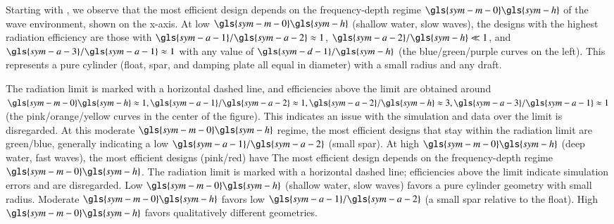 \ifdefined\DISSERTATION
    Starting with , we observe that the most efficient design depends on the frequency-depth regime $\gls{sym-m-0}\gls{sym-h}$ of the wave environment, shown on the x-axis.
    At low $\gls{sym-m-0}\gls{sym-h}$ (shallow water, slow waves), the designs with the highest radiation efficiency are those with $\gls{sym-a-1}/\gls{sym-a-2} \approx 1$, $\gls{sym-a-2}/\gls{sym-h} \ll 1$, and $\gls{sym-a-3}/\gls{sym-a-1}\approx 1$ with any value of $\gls{sym-d-1}/\gls{sym-h}$ (the blue/green/purple curves on the left).
    This represents a pure cylinder (float, spar, and damping plate all equal in diameter) with a small radius and any draft.
    
    The radiation limit is marked with a horizontal dashed line, and efficiencies above the limit are obtained around $\gls{sym-m-0}\gls{sym-h}\approx 1, \gls{sym-a-1}/\gls{sym-a-2}\approx 1, \gls{sym-a-2}/\gls{sym-h}\approx 3, \gls{sym-a-3}/\gls{sym-a-1}\approx 1$ (the pink/orange/yellow curves in the center of the figure).
    This indicates an issue with the simulation and data over the limit is disregarded.
    At this moderate $\gls{sym-m-0}\gls{sym-h}$ regime, the most efficient designs that stay within the radiation limit are green/blue, generally indicating a low $\gls{sym-a-1}/\gls{sym-a-2}$ (small spar).
    At high $\gls{sym-m-0}\gls{sym-h}$ (deep water, fast waves), the most efficient designs (pink/red) have
\else
    The most efficient design depends on the frequency-depth regime $\gls{sym-m-0}\gls{sym-h}$.
    The radiation limit is marked with a horizontal dashed line; efficiencies above the limit indicate simulation errors and are disregarded.
    Low $\gls{sym-m-0}\gls{sym-h}$ (shallow water, slow waves) favors a pure cylinder geometry with small radius.
    Moderate $\gls{sym-m-0}\gls{sym-h}$ favors low $\gls{sym-a-1}/\gls{sym-a-2}$ (a small spar relative to the float).
    High $\gls{sym-m-0}\gls{sym-h}$ favors qualitatively different geometries.
\fi

